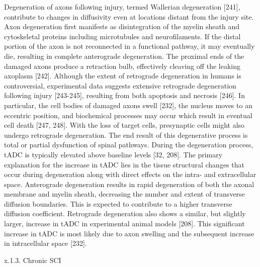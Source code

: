 Degeneration of axons following injury, termed Wallerian degeneration [241], contribute to changes in diffusivity even at locations distant from the injury site.  Axon degeneration first manifests as disintegration of the myelin sheath and cytoskeletal proteins including microtubules and neurofilaments.  If the distal portion of the axon is not reconnected in a functional pathway, it may eventually die, resulting in complete anterograde degeneration.  The proximal ends of the damaged axons produce a retraction bulb, effectively cleaving off the leaking axoplasm [242].  Although the extent of retrograde degeneration in humans is controversial, experimental data suggests extensive retrograde degeneration following injury [243-245], resulting from both apoptosis and necrosis [246].  In particular, the cell bodies of damaged axons swell [232], the nucleus moves to an eccentric position, and biochemical processes may occur which result in eventual cell death [247, 248].  With the loss of target cells, presynaptic cells might also undergo retrograde degeneration.  The end result of this degenerative process is total or partial dysfunction of spinal pathways. 
During the degeneration process, tADC is typically elevated above baseline levels [32, 208].  The primary explanation for the increase in tADC lies in the tissue structural changes that occur during degeneration along with direct effects on the intra- and extracellular space.  Anterograde degeneration results in rapid degeneration of both the axonal membrane and myelin sheath, decreasing the number and extent of transverse diffusion boundaries.  This is expected to contribute to a higher transverse diffusion coefficient.  Retrograde degeneration also shows a similar, but slightly larger, increase in tADC in experimental animal models [208].  This significant increase in tADC is most likely due to axon swelling and the subsequent increase in intracellular space [232]. 


x.1.3. Chronic SCI

